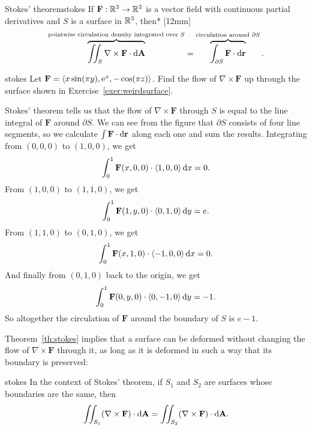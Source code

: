 \documentclass{watsonbook}
\begin{document}
\begin{theo}{Stokes' theorem}{stokes}
  If $\mathbf{F} : \mathbb{R}^3 \to \mathbb{R}^3$ is a vector field with continuous
  partial derivatives and $S$ is a surface in $\mathbb{R}^3$, then*
  [12mm]
  \[
    \overbrace{\iint_S \nabla \times \mathbf{F} \cdot
      \mathrm{d}\mathbf{A}}^{\text{pointwise circulation density integrated
        over $S$}} =
    \overbrace{\int_{\partial S} \mathbf{F} \cdot
      \mathrm{d}\mathbf{r}}^{\text{circulation around $\partial S$}}. 
  \]
\end{theo}

\begin{example}{}{stokes}
  Let $\mathbf{F} = \langle x \sin (\pi y), \operatorname{e}^x, -\cos(\pi z)
  \rangle$. Find the flow of $\nabla \times \mathbf{F}$ up through the
  surface shown in Exercise~\ref{exer:weirdsurface}.
\end{example}

\begin{solution} 
  Stokes' theorem tells us that the flow of $\nabla \times \mathbf{F}$
  through $S$ is equal to the line integral of $\mathbf{F}$ around
  $\partial S$. We can see from the figure that $\partial S$ consists
  of four line segments, so we calculate
  $\int \mathbf{F} \cdot {\mathrm{d}}\mathbf{r}$ along each one and sum the
  results. Integrating from $(0,0,0)$ to $(1,0,0)$, we get
  \[
    \int_0^1\mathbf{F}(x,0,0) \cdot \langle 1, 0, 0 \rangle  \, \mathrm{d} x =
    0. 
  \]
  From $(1,0,0)$ to $(1,1,0)$, we get
  \[
    \int_0^1\mathbf{F}(1,y,0) \cdot \langle 0, 1, 0 \rangle  \, \mathrm{d} y =
    e. 
  \]
  From $(1,1,0)$ to $(0,1,0)$, we get
  \[
    \int_0^1\mathbf{F}(x,1,0) \cdot \langle -1, 0, 0 \rangle  \, \mathrm{d} x = 0. 
  \]
  And finally from $(0,1,0)$ back to the origin, we get
  \[
    \int_0^1\mathbf{F}(0,y,0) \cdot \langle 0, -1, 0 \rangle  \, \mathrm{d} y = -1. 
  \]
  So altogether the circulation of $\mathbf{F}$ around the boundary of
  $S$ is $\boxed{e-1}$. 
\end{solution}

Theorem~\ref{th:stokes} implies that a surface can be deformed without
changing the  flow of $\nabla \times \mathbf{F}$ through it, as
long as it is deformed in such a way that its boundary is preserved: 

\begin{obs}{}{stokes}
  In the context of Stokes' theorem, if $S_1$ and $S_2$ are surfaces
  whose boundaries are the same, then
  \[
    \iint_{S_1} (\nabla \times \mathbf{F}) \cdot \mathrm{d}\mathbf{A} =
  \iint_{S_2}
  (\nabla \times \mathbf{F})
  \cdot \mathrm{d}\mathbf{A}. 
\]
\end{obs}
\end{document}
